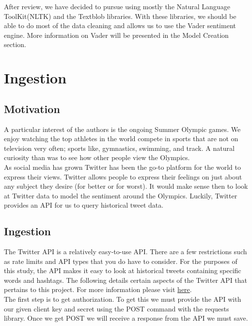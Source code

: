 \documentclass[12pt]{article}
\begin{document}
            After review, we have decided to pursue using mostly the Natural Language ToolKit(NLTK) and the Textblob libraries. With these libraries, we should be able to do most of the
            data cleaning and allows us to use the Vader sentiment engine. More information on Vader will be presented in the Model Creation section.

    \section{Ingestion}
        \subsection{Motivation}
            A particular interest of the authors is the ongoing Summer Olympic games. We enjoy watching the top athletes in the world compete in sports that are not on television very
            often; sports like, gymnastics, swimming, and track. A natural curiosity than was to see how other people view the Olympics. \\

            As social media has grown Twitter has been the go-to platform for the world to express their views. Twitter allows people to express their feelings on just about any subject
            they desire (for better or for worst). It would make sense then to look at Twitter data to model the sentiment around the Olympics. Luckily, Twitter provides an API  for us
            to query historical tweet data.

        \subsection{Ingestion}
            The Twitter API is a relatively easy-to-use API. There are a few restrictions such as rate limits and API types that you do have to consider. For the purposes of this study,
            the API makes it easy to look at historical tweets containing specific words and hashtags. The following details certain aspects of the Twitter API that pertains to this
            project. For more information please visit \href{https://developer.twitter.com/en/docs/twitter-api}{here}. \\

            The first step is to get authorization. To get this we must provide the API with our given client key and secret using the POST command with the requests library. Once we
            get POST we will receive a response from the API we must save.
            
\end{document}
